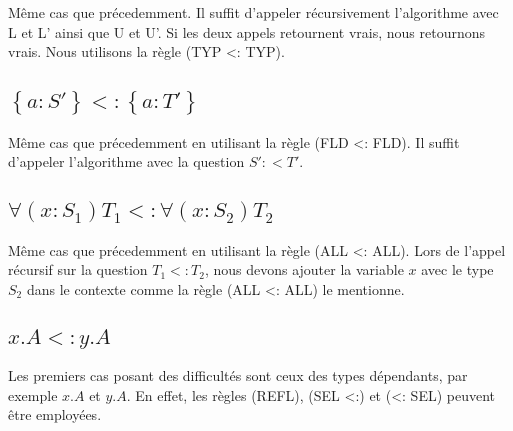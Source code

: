 Même cas que précedemment. Il suffit d'appeler récursivement l'algorithme avec L
et L' ainsi que U et U'. Si les deux appels retournent vrais, nous retournons
vrais. Nous utilisons la règle (TYP <: TYP).

\subsection*{$\left\{ a : S' \right\} <: \left\{ a : T' \right\}$}

Même cas que précedemment en utilisant la règle (FLD <: FLD). Il suffit
d'appeler l'algorithme avec la question $S' :< T'$.

\subsection*{$\forall(x : S_{1}) T_{1} <: \forall(x : S_{2}) T_{2}$}

Même cas que précedemment en utilisant la règle (ALL <: ALL). Lors de l'appel
récursif sur la question $T_{1} <: T_{2}$, nous devons ajouter la variable $x$
avec le type $S_{2}$ dans le contexte comme la règle (ALL <: ALL) le mentionne.

\subsection*{$x.A <: y.A$}

Les premiers cas posant des difficultés sont ceux des types dépendants, par exemple
$x.A$ et $y.A$. En effet, les règles (REFL), (SEL <:) et (<: SEL) peuvent être
employées.

